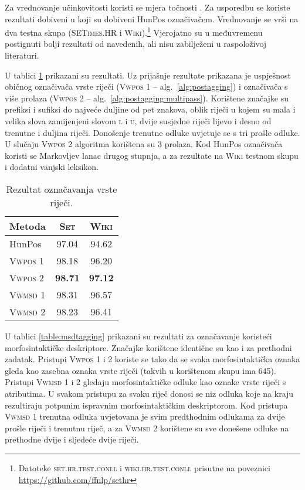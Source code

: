 Za vrednovanje učinkovitosti koristi se mjera točnosti . Za
usporedbu se koriste rezultati dobiveni u \citep{agic2013lemmatization} koji su
dobiveni HunPos označivačem. Vrednovanje se vrši na dva testna skupa
(\textsc{SETimes.HR} i \textsc{Wiki}).\footnote{Datoteke
\textsc{set.hr.test.conll} i \textsc{wiki.hr.test.conll} prisutne na poveznici
\url{https://github.com/ffnlp/sethr}} Vjerojatno su u međuvremenu postignuti
bolji rezultati od navedenih, ali nisu zabilježeni u raspoloživoj literaturi.

U tablici \ref{table:postagging} prikazani su rezultati. Uz prijašnje rezultate
prikazana je uspješnost običnog označivača vrste riječi (\textsc{Vwpos 1} --
alg.~\ref{alg:postagging}) i označivača s više prolaza (\textsc{Vwpos 2} --
alg.~\ref{alg:postagging:multipass}). Korištene značajke su prefiksi i sufiksi
do najveće duljine od pet znakova, oblik riječi u kojem su mala i velika slova
zamijenjeni slovom \textsc{l} i \textsc{u}, dvije susjedne riječi lijevo i desno
od trenutne i duljina riječi. Donošenje trenutne odluke uvjetuje se s tri prošle
odluke. U slučaju \textsc{Vwpos 2} algoritma korištena su 3 prolaza. Kod HunPos
označivača koristi se Markovljev lanac drugog stupnja, a za rezultate na
\textsc{Wiki} testnom skupu i dodatni vanjski leksikon.

\begin{table}[]
\centering
\caption[Rezultat označavanja vrste riječi.]{Rezultat označavanja vrste riječi.}
\label{table:postagging}
\begin{tabular}{|l|c|c|}
\hline
Metoda             & \textsc{Set}   & \textsc{Wiki}  \\ \hline \hline
HunPos             & 97.04          & 94.62          \\
\textsc{Vwpos 1}   & 98.18          & 96.20          \\
\textsc{Vwpos 2}   & \textbf{98.71} & \textbf{97.12} \\
\textsc{Vwmsd} 1   & 98.31          & 96.57          \\
\textsc{Vwmsd} 2   & 98.23          & 96.41          \\ \hline
\end{tabular}
\end{table}

U tablici \ref{table:msdtagging} prikazani su rezultati za označavanje koristeći
morfosintaktičke deskriptore. Značajke korištene identične su kao i za prethodni
zadatak. Pristupi \textsc{Vwpos 1} i \textsc{2} koriste se tako da se svaka
morfosintaktička oznaka gleda kao zasebna oznaka vrste riječi (takvih u
korištenom skupu ima 645). Pristupi \textsc{Vwmsd} 1 i 2 gledaju
morfosintaktičke odluke kao oznake vrste riječi s atributima. U svakom pristupu
za svaku riječ donosi se niz odluka koje na kraju rezultiraju potpunim ispravnim
morfosintaktičkim deskriptorom.  Kod pristupa \textsc{Vwmsd 1} trenutna odluka
uvjetovana je svim predthodnim odlukama za dvije prošle riječi i trenutnu riječ,
a za \textsc{Vwmsd 2} korištene su sve donešene odluke na prethodne dvije i
sljedeće dvije riječi.

